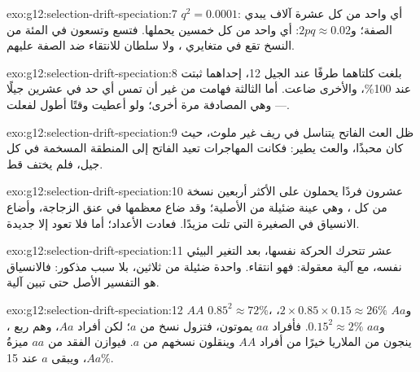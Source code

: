\begin{solution}{exo:g12:selection-drift-speciation:7}
$q^2 = 0.0001$: أي واحد من كل عشرة آلاف يبدي الصفة؛ و$2pq \approx
0.02$: أي واحد من كل خمسين يحملها. فتسع وتسعون في المئة من النسخ تقع
في متغايري ، ولا سلطان للانتقاء ضد الصفة عليهم.
\end{solution}

\begin{solution}{exo:g12:selection-drift-speciation:8}
بلغت كلتاهما طرفًا عند الجيل 12، إحداهما ثبتت عند 100\%، والأخرى
ضاعت. أما الثالثة فهامت من غير أن تمس أي حد في عشرين جيلًا --- وهي
المصادفة مرة أخرى؛ ولو أعطيت وقتًا أطول لفعلت.
\end{solution}

\begin{solution}{exo:g12:selection-drift-speciation:9}
ظل العث الفاتح يتناسل في ريف غير ملوث، حيث كان محبذًا، والعث يطير:
فكانت المهاجرات تعيد  الفاتح إلى المنطقة المسخمة في كل جيل، فلم
يختف قط.
\end{solution}

\begin{solution}{exo:g12:selection-drift-speciation:10}
عشرون فردًا يحملون على الأكثر أربعين نسخة من كل ، وهي عينة ضئيلة
من  الأصلية؛ وقد ضاع معظمها في عنق الزجاجة، وأضاع الانسياق في
 الصغيرة التي تلت مزيدًا. فعادت الأعداد؛ أما  فلا تعود
إلا  جديدة.
\end{solution}

\begin{solution}{exo:g12:selection-drift-speciation:11}
عشر  تتحرك الحركة نفسها، بعد التغير البيئي نفسه، مع آلية معقولة:
فهو انتقاء.  واحدة ضئيلة من ثلاثين، بلا سبب مذكور: فالانسياق هو
التفسير الأصل حتى تبين آلية.
\end{solution}

\begin{solution}{exo:g12:selection-drift-speciation:12}
$AA$ $0.85^2 \approx 72\%$، و$Aa$ $2 \times 0.85 \times 0.15 \approx
26\%$، و$aa$ $0.15^2 \approx 2\%$. فأفراد $aa$ يموتون، فتزول نسخ من
$a$؛ لكن أفراد $Aa$، وهم ربع ، ينجون من الملاريا خيرًا من أفراد
$AA$ وينقلون نسخهم من $a$. فيوازن الفقد من $aa$ ميزةُ $Aa$، ويبقى $a$
عند 15\%.
\end{solution}

